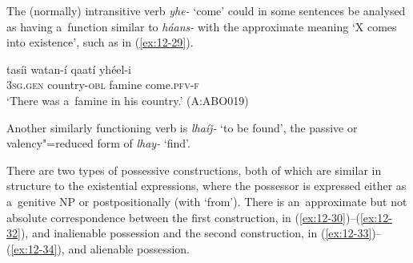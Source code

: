The (normally) intransitive verb \textit{yhe-} `come' could in some sentences be analysed as having a~function similar to \textit{háans-} with the approximate meaning `X comes into existence', such as in (\ref{ex:12-29}).

\begin{exe}
\ex
\label{ex:12-29}
\gll tasíi watan-í qaatí yhéel-i \\
\textsc{3sg.gen} country-\textsc{obl} famine come.\textsc{pfv-f} \\
\glt `There was a~famine in his country.' (A:ABO019)
\end{exe}

Another similarly functioning verb is \textit{lhaíǰ-} `to be found', the passive or valency"=reduced form of \textit{lhay-} `find'.


 There are two types of possessive constructions, both of which are similar in structure to the existential expressions, where the possessor is expressed either as a~genitive NP or postpositionally (with `from'). There is an~approximate but not absolute correspondence between the first construction, in (\ref{ex:12-30})--(\ref{ex:12-32}), and inalienable possession and the second construction, in (\ref{ex:12-33})--(\ref{ex:12-34}), and alienable possession.

